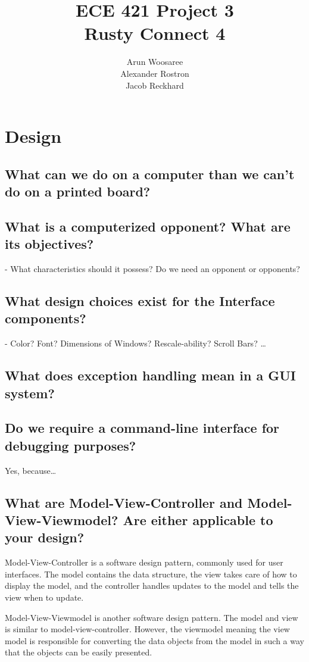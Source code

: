 \documentclass[letterpaper]{article}
\title{ECE 421 Project 3\\
Rusty Connect 4}
\author{Arun Woosaree\\
Alexander Rostron\\
Jacob Reckhard
}
\begin{document}
\maketitle %


\section{Design}
\subsection{What can we do on a computer than we can’t do on a printed board?}

\subsection{What is a computerized opponent? What are its objectives?}
- What characteristics should it possess? Do we need an opponent or opponents?


\subsection{What design choices exist for the Interface components?}
- Color? Font? Dimensions of Windows? Rescale-ability? Scroll Bars? \dots

\subsection{What does exception handling mean in a GUI system?}

\subsection{Do we require a command-line interface for debugging purposes?}
Yes, because\dots

\subsection{What are Model-View-Controller and Model-View-Viewmodel? Are either applicable to your
design?}

Model-View-Controller is a software design pattern, commonly used for user interfaces.
The model contains the data structure, the view takes care of how to display the model,
and the controller handles updates to the model and tells the view when to update.

Model-View-Viewmodel is another software design pattern. The model and view is similar to model-view-controller.
However, the viewmodel meaning the view model is responsible for converting the data objects from the model in such
a way that the objects can be easily presented.
\end{document}
